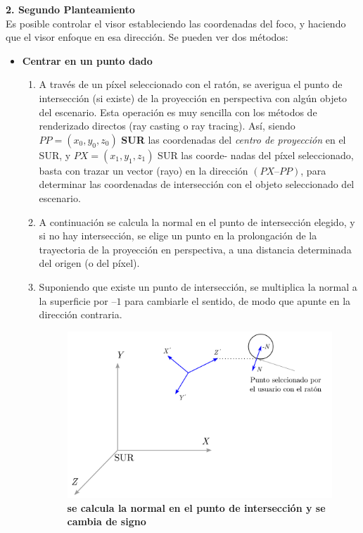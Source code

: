 \clearpage

\textbf{2. Segundo Planteamiento}\\
Es posible controlar el visor estableciendo las coordenadas del foco, y haciendo que el visor enfoque en esa dirección. Se pueden ver dos métodos:
\begin{itemize}
    \item \textbf{Centrar en un punto dado}
    \begin{enumerate}
        \item A través de un píxel seleccionado con el ratón, se averigua el punto de intersección (si existe) de la proyección en perspectiva con algún objeto del escenario. Esta operación es muy sencilla con los métodos de renderizado directos (ray casting o ray tracing). Así, siendo $PP = (x_0, y_0, z_0)$ \textbf{SUR} las coordenadas del \textit{centro de proyección} en el SUR, y $PX = (x_1, y_1, z_1)$ SUR las coorde- nadas del píxel seleccionado, basta con trazar un vector (rayo) en la dirección $(PX – PP)$, para determinar las coordenadas de intersección con el objeto seleccionado del escenario.
        
        \item A continuación se calcula la normal en el punto de intersección elegido, y si no hay intersección, se elige un punto en la prolongación de la trayectoria de la proyección en perspectiva, a una distancia determinada del origen (o del píxel).
        
        \item Suponiendo que existe un punto de intersección, se multiplica la normal a la superficie por $–1$ para cambiarle el sentido, de modo que apunte en la dirección contraria.
        
        \begin{figure}[h]
        \includegraphics[width=12cm]{Img/GEO/geo-visor-10.png}
        \centering
        \caption{\footnotesize{\textbf{se calcula la normal en el punto de intersección y se cambia de signo}}}
        \label{geo-visor10}
        \end{figure}
        

\end{enumerate}
\end{itemize}
